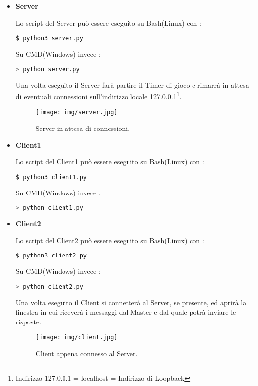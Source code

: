 \documentclass[a4paper,12pt]{report}
\begin{document}
\begin{itemize}
	\item \textbf{Server}

	\noindent Lo script del Server può essere eseguito su Bash(Linux) con  :
	\begin{lstlisting}[language=bash]
	  $ python3 server.py
	\end{lstlisting}	
	\noindent Su CMD(Windows) invece  :
	\begin{lstlisting}[language=bash]
	  > python server.py
	\end{lstlisting}
	Una volta eseguito il Server farà partire il Timer di gioco e rimarrà in attesa di eventuali connessioni sull’indirizzo 
	locale 127.0.0.1\footnote{Indirizzo 127.0.0.1 = localhost = Indirizzo di Loopback}.
	\begin{figure}[H]
		\centering{}
		\texttt{[image: img/server.jpg]}
		\caption{Server in attesa di connessioni.}
		\label{img:server}
	\end{figure}

	\item \textbf{Client1}

	\noindent Lo script del Client1 può essere eseguito su Bash(Linux) con :
	\begin{lstlisting}[language=bash]
	  $ python3 client1.py
	\end{lstlisting}
	\noindent Su CMD(Windows) invece  :
	\begin{lstlisting}[language=bash]
	  > python client1.py
	\end{lstlisting}
	\item \textbf{Client2}
	 
	\noindent Lo script del Client2 può essere eseguito su Bash(Linux) con :
	\begin{lstlisting}[language=bash]
	  $ python3 client2.py
	\end{lstlisting}
	\noindent Su CMD(Windows) invece  :
	\begin{lstlisting}[language=bash]
	  > python client2.py
	\end{lstlisting}
	
	Una volta eseguito il Client si connetterà al Server, se presente, ed aprirà la finestra 
	in cui riceverà i messaggi dal Master e dal quale potrà inviare le risposte.
	\begin{figure}[H]
		\centering{}
		\texttt{[image: img/client.jpg]}
		\caption{Client appena connesso al Server.}
		\label{img:client}
	\end{figure}

\end{itemize}
\end{document}
